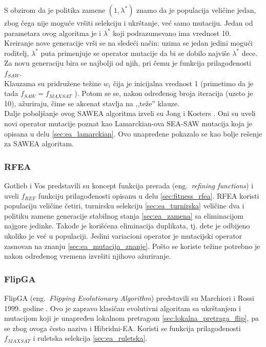 \documentclass[a4paper]{article}
\begin{document}
S obzirom da je politika zamene $(1,\lambda^*)$ znamo da je populacija veličine jedan,
zbog čega nije moguće vršiti selekciju i ukrštanje, već samo mutaciju. 
Jedan od parametara ovog algoritma je i $\lambda^*$ koji podrazumevano ima vrednost 10.
Kreiranje nove generacije vrši se na sledeći način:
uzima se jedan jedini mogući roditelj, $\lambda^*$ puta primenjuje se operator mutacije
da bi se dobilo najviše $\lambda^*$ dece. Za novu generaciju bira se najbolji od njih,
pri čemu je funkcija prilagođenosti $f_{SAW}$.\\

Klauzama su pridružene težine $w_i$ čija je inicijalna vrednost 1 
(primetimo da je tada $f_{SAW} = f_{MAXSAT}$ ). 
Potom se se, nakon određenog broja iteracija (uzeto je 10),
ažuriraju, čime se akcenat stavlja na ,,teže'' klauze.\\

Dalje poboljšanje ovog SAWEA algoritma izveli su Jong i Kosters \cite{Jong&Kosters}.
Oni su uveli novi operator mutacije poznat kao Lamarckian-ova SEA-SAW mutacija koja je opisana
u delu \ref{sec:ea_lamarckian}. Ovo unapređene pokazalo se kao bolje rešenje za
SAWEA algoritam.


\subsubsection{RFEA}
\label{sec:ea_rfea}
Gotlieb i Vos \cite{GotVos98_f_ref, ea_with_table, ea_without_table} predstavili su koncept
funkcija prerada (eng.~{\em refining functions}) i uveli $f_{REF}$ funkciju prilagođenosti
opisanu u delu \ref{sec:fitness_rfea}. 
RFEA koristi populaciju veličine četiri, turnirsku selekciju \ref{sec:ea_turnirska}
veličine dva i politiku zamene generacije stabilnog stanja \ref{sec:ea_zamena} 
sa eliminacijom najgore jedinke. 
Takođe je korišćena eliminacija duplikata, tj. dete je odbijeno ukoliko je već u populaciji.
Jedini variacioni operator je mutacijski operator zasnovan na znanju \ref{sec:ea_mutacija_znanje}.
Pošto se koriste težine potrebno je nakon određenog vremena izvršiti njihovo ažuriranje.


\subsubsection{FlipGA}
\label{sec:ea_flipga}
FlipGA (eng.~{\em Flipping Evolutionary Algorithm}) predstavili su Marchiori i Rossi 1999.
godine \cite{MaRos99_flipGA, ea_with_table}. Ovo je zapravo klasičan evolutivni algoritam
sa ukrštanjem i mutacijom koji je unapređen lokalnom pretragom 
\ref{sec:lokalna_pretraga_flip}, pa se zbog ovoga često naziva i Hibridni-EA. 
Koristi se funkcija prilagođenosti $f_{MAXSAT}$ i ruletska selekcija \ref{sec:ea_ruletska}.\\
\end{document}
